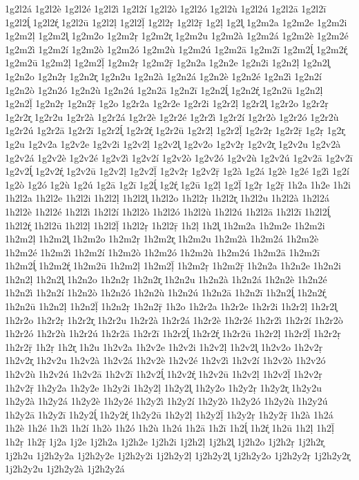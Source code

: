 {1g2l2á
1g2l2è
1g2l2é
1g2l2ì
1g2l2í
1g2l2ò
1g2l2ó
1g2l2ù
1g2l2ú
1g2l2ā
1g2l2ī
1g2l2ĺ̥
1g2l2ŕ̥
1g2l2ū
1g2l2ḷ
1g2l2ḹ
1g2l2ṛ
1g2l2ṝ
1g2ḷ
1g2l̥
1g2m2a
1g2m2e
1g2m2i
1g2m2ḷ
1g2m2l̥
1g2m2o
1g2m2ṛ
1g2m2r̥
1g2m2u
1g2m2à
1g2m2á
1g2m2è
1g2m2é
1g2m2ì
1g2m2í
1g2m2ò
1g2m2ó
1g2m2ù
1g2m2ú
1g2m2ā
1g2m2ī
1g2m2ĺ̥
1g2m2ŕ̥
1g2m2ū
1g2m2ḷ
1g2m2ḹ
1g2m2ṛ
1g2m2ṝ
1g2n2a
1g2n2e
1g2n2i
1g2n2ḷ
1g2n2l̥
1g2n2o
1g2n2ṛ
1g2n2r̥
1g2n2u
1g2n2à
1g2n2á
1g2n2è
1g2n2é
1g2n2ì
1g2n2í
1g2n2ò
1g2n2ó
1g2n2ù
1g2n2ú
1g2n2ā
1g2n2ī
1g2n2ĺ̥
1g2n2ŕ̥
1g2n2ū
1g2n2ḷ
1g2n2ḹ
1g2n2ṛ
1g2n2ṝ
1g2o
1g2r2a
1g2r2e
1g2r2i
1g2r2ḷ
1g2r2l̥
1g2r2o
1g2r2ṛ
1g2r2r̥
1g2r2u
1g2r2à
1g2r2á
1g2r2è
1g2r2é
1g2r2ì
1g2r2í
1g2r2ò
1g2r2ó
1g2r2ù
1g2r2ú
1g2r2ā
1g2r2ī
1g2r2ĺ̥
1g2r2ŕ̥
1g2r2ū
1g2r2ḷ
1g2r2ḹ
1g2r2ṛ
1g2r2ṝ
1g2ṛ
1g2r̥
1g2u
1g2v2a
1g2v2e
1g2v2i
1g2v2ḷ
1g2v2l̥
1g2v2o
1g2v2ṛ
1g2v2r̥
1g2v2u
1g2v2à
1g2v2á
1g2v2è
1g2v2é
1g2v2ì
1g2v2í
1g2v2ò
1g2v2ó
1g2v2ù
1g2v2ú
1g2v2ā
1g2v2ī
1g2v2ĺ̥
1g2v2ŕ̥
1g2v2ū
1g2v2ḷ
1g2v2ḹ
1g2v2ṛ
1g2v2ṝ
1g2à
1g2á
1g2è
1g2é
1g2ì
1g2í
1g2ò
1g2ó
1g2ù
1g2ú
1g2ā
1g2ī
1g2ĺ̥
1g2ŕ̥
1g2ū
1g2ḷ
1g2ḹ
1g2ṛ
1g2ṝ
1h2a
1h2e
1h2i
1h2l2a
1h2l2e
1h2l2i
1h2l2ḷ
1h2l2l̥
1h2l2o
1h2l2ṛ
1h2l2r̥
1h2l2u
1h2l2à
1h2l2á
1h2l2è
1h2l2é
1h2l2ì
1h2l2í
1h2l2ò
1h2l2ó
1h2l2ù
1h2l2ú
1h2l2ā
1h2l2ī
1h2l2ĺ̥
1h2l2ŕ̥
1h2l2ū
1h2l2ḷ
1h2l2ḹ
1h2l2ṛ
1h2l2ṝ
1h2ḷ
1h2l̥
1h2m2a
1h2m2e
1h2m2i
1h2m2ḷ
1h2m2l̥
1h2m2o
1h2m2ṛ
1h2m2r̥
1h2m2u
1h2m2à
1h2m2á
1h2m2è
1h2m2é
1h2m2ì
1h2m2í
1h2m2ò
1h2m2ó
1h2m2ù
1h2m2ú
1h2m2ā
1h2m2ī
1h2m2ĺ̥
1h2m2ŕ̥
1h2m2ū
1h2m2ḷ
1h2m2ḹ
1h2m2ṛ
1h2m2ṝ
1h2n2a
1h2n2e
1h2n2i
1h2n2ḷ
1h2n2l̥
1h2n2o
1h2n2ṛ
1h2n2r̥
1h2n2u
1h2n2à
1h2n2á
1h2n2è
1h2n2é
1h2n2ì
1h2n2í
1h2n2ò
1h2n2ó
1h2n2ù
1h2n2ú
1h2n2ā
1h2n2ī
1h2n2ĺ̥
1h2n2ŕ̥
1h2n2ū
1h2n2ḷ
1h2n2ḹ
1h2n2ṛ
1h2n2ṝ
1h2o
1h2r2a
1h2r2e
1h2r2i
1h2r2ḷ
1h2r2l̥
1h2r2o
1h2r2ṛ
1h2r2r̥
1h2r2u
1h2r2à
1h2r2á
1h2r2è
1h2r2é
1h2r2ì
1h2r2í
1h2r2ò
1h2r2ó
1h2r2ù
1h2r2ú
1h2r2ā
1h2r2ī
1h2r2ĺ̥
1h2r2ŕ̥
1h2r2ū
1h2r2ḷ
1h2r2ḹ
1h2r2ṛ
1h2r2ṝ
1h2ṛ
1h2r̥
1h2u
1h2v2a
1h2v2e
1h2v2i
1h2v2ḷ
1h2v2l̥
1h2v2o
1h2v2ṛ
1h2v2r̥
1h2v2u
1h2v2à
1h2v2á
1h2v2è
1h2v2é
1h2v2ì
1h2v2í
1h2v2ò
1h2v2ó
1h2v2ù
1h2v2ú
1h2v2ā
1h2v2ī
1h2v2ĺ̥
1h2v2ŕ̥
1h2v2ū
1h2v2ḷ
1h2v2ḹ
1h2v2ṛ
1h2v2ṝ
1h2y2a
1h2y2e
1h2y2i
1h2y2ḷ
1h2y2l̥
1h2y2o
1h2y2ṛ
1h2y2r̥
1h2y2u
1h2y2à
1h2y2á
1h2y2è
1h2y2é
1h2y2ì
1h2y2í
1h2y2ò
1h2y2ó
1h2y2ù
1h2y2ú
1h2y2ā
1h2y2ī
1h2y2ĺ̥
1h2y2ŕ̥
1h2y2ū
1h2y2ḷ
1h2y2ḹ
1h2y2ṛ
1h2y2ṝ
1h2à
1h2á
1h2è
1h2é
1h2ì
1h2í
1h2ò
1h2ó
1h2ù
1h2ú
1h2ā
1h2ī
1h2ĺ̥
1h2ŕ̥
1h2ū
1h2ḷ
1h2ḹ
1h2ṛ
1h2ṝ
1j2a
1j2e
1j2h2a
1j2h2e
1j2h2i
1j2h2ḷ
1j2h2l̥
1j2h2o
1j2h2ṛ
1j2h2r̥
1j2h2u
1j2h2y2a
1j2h2y2e
1j2h2y2i
1j2h2y2ḷ
1j2h2y2l̥
1j2h2y2o
1j2h2y2ṛ
1j2h2y2r̥
1j2h2y2u
1j2h2y2à
1j2h2y2á
}
